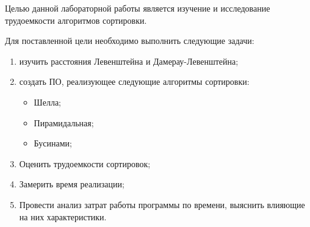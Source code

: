 Целью данной лабораторной работы является изучение и исследование трудоемкости алгоритмов сортировки.

Для поставленной цели необходимо выполнить следующие задачи:
\begin{enumerate}[label={\arabic*)}]
	\item изучить расстояния Левенштейна и Дамерау-Левенштейна;
	\item создать ПО, реализующее следующие алгоритмы сортировки:
	\begin{itemize}
		\item Шелла;
		\item Пирамидальная;
		\item Бусинами;
	\end{itemize}
	\item Оценить трудоемкости сортировок;
	\item Замерить время реализации;
	\item Провести анализ затрат работы программы по времени, выяснить влияющие на них характеристики.
\end{enumerate}